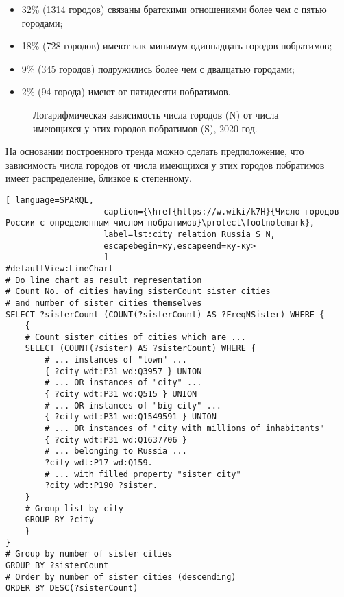 \begin{itemize}
\item 32\% (\num{1314} городов) связаны братскими отношениями более чем с пятью городами;
\item 18\% (728 городов) имеют как минимум одиннадцать городов-побратимов;
\item 9\% (345 городов) подружились более чем с двадцатью городами;
\item 2\% (94 города) имеют от пятидесяти побратимов.
\end{itemize}

\begin{figure*}[h]
{
\setlength{\fboxsep}{0pt}%
\setlength{\fboxrule}{1pt}%
%
}
  \caption{Логарифмическая зависимость числа городов (N) от числа имеющихся у этих городов побратимов (S), 2020 год.}%
  \label{fig:city_ln_relation_S_N}%
\end{figure*}

На основании построенного тренда можно сделать предположение, что зависимость числа городов от числа имеющихся у этих городов побратимов имеет распределение, близкое к степенному.

\begin{lstlisting}[ language=SPARQL, 
                    caption={\href{https://w.wiki/k7H}{Число городов России с определенным числом побратимов}\protect\footnotemark},
                    label=lst:city_relation_Russia_S_N, 
                    escapebegin=ку,escapeend=ку-ку>
                    ]
#defaultView:LineChart                                                   
# Do line chart as result representation
# Count No. of cities having sisterCount sister cities  
# and number of sister cities themselves
SELECT ?sisterCount (COUNT(?sisterCount) AS ?FreqNSister) WHERE {                                                                                  
	{
	# Count sister cities of cities which are ...
	SELECT (COUNT(?sister) AS ?sisterCount) WHERE {    
		# ... instances of "town" ...                 
		{ ?city wdt:P31 wd:Q3957 } UNION    
		# ... OR instances of "city" ...                              
		{ ?city wdt:P31 wd:Q515 } UNION     
		# ... OR instances of "big city" ...                              
		{ ?city wdt:P31 wd:Q1549591 } UNION     
		# ... OR instances of "city with millions of inhabitants"                          
		{ ?city wdt:P31 wd:Q1637706 }                 
		# ... belonging to Russia ...                    
		?city wdt:P17 wd:Q159. 
		# ... with filled property "sister city"                                           
		?city wdt:P190 ?sister.                                           
	}
	# Group list by city
	GROUP BY ?city                                                      
	}
}
# Group by number of sister cities
GROUP BY ?sisterCount       
# Order by number of sister cities (descending)                                             
ORDER BY DESC(?sisterCount)                                             
\end{lstlisting}

